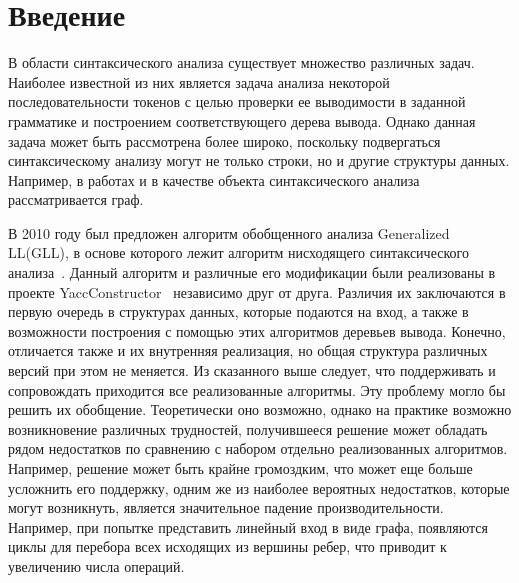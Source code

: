 \documentclass[14pt]{matmex-diploma}
\begin{document}
\maketitle
\tableofcontents

\section*{Введение}
В области синтаксического анализа существует множество различных задач. Наиболее известной из них является задача анализа некоторой последовательности токенов с целью проверки ее выводимости в заданной грамматике и построением соответствующего дерева вывода. Однако данная задача может быть рассмотрена более широко, поскольку подвергаться синтаксическому анализу могут не только строки, но и другие структуры данных. Например, в работах \cite{graphParseVerb} и \cite{graphParseRag} в качестве объекта синтаксического анализа рассматривается граф.

В 2010 году был предложен алгоритм обобщенного анализа Generalized LL(GLL), в основе которого лежит алгоритм нисходящего синтаксического анализа~\cite{GLLParsing}. Данный алгоритм и различные его модификации были реализованы в проекте YaccConstructor~\cite{YaccConstructor} независимо друг от друга. Различия их заключаются в первую очередь в структурах данных, которые подаются на вход, а также в возможности построения с помощью этих алгоритмов деревьев вывода. Конечно, отличается также и их внутренняя реализация, но общая структура различных версий при этом не меняется. Из сказанного выше следует, что поддерживать и сопровождать приходится все реализованные алгоритмы. Эту проблему могло бы решить их обобщение. Теоретически оно возможно, однако на практике возможно возникновение различных трудностей, получившееся решение может обладать рядом недостатков по сравнению с набором отдельно реализованных алгоритмов. Например, решение может быть крайне громоздким, что может еще больше усложнить его поддержку, одним же из наиболее вероятных недостатков, которые могут возникнуть, является значительное падение производительности. Например, при попытке представить линейный вход в виде графа, появляются циклы для перебора всех исходящих из вершины ребер, что приводит к увеличению числа операций.
\end{document}
